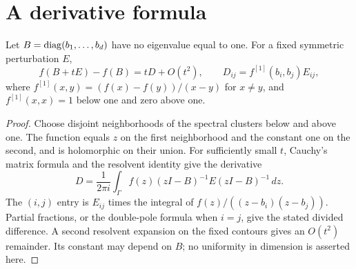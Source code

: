 \documentclass[11pt]{article}
\begin{document}
\section{A derivative formula}
\begin{lemma}\label{lem:derivative}
Let $B=\operatorname{diag}(b_1,\ldots,b_d)$ have no eigenvalue equal to one. For a fixed symmetric perturbation $E$,
\[
 f(B+tE)-f(B)=tD+O(t^2),\qquad
 D_{ij}=f^{[1]}(b_i,b_j)E_{ij},
\]
where $f^{[1]}(x,y)=(f(x)-f(y))/(x-y)$ for $x\ne y$, and $f^{[1]}(x,x)=1$ below one and zero above one.
\end{lemma}
\begin{proof}
Choose disjoint neighborhoods of the spectral clusters below and above one. The function equals $z$ on the first neighborhood and the constant one on the second, and is holomorphic on their union. For sufficiently small $t$, Cauchy's matrix formula and the resolvent identity give the derivative
\[
 D=\frac1{2\pi i}\int_\Gamma
      f(z)(zI-B)^{-1}E(zI-B)^{-1}\,dz.
\]
The $(i,j)$ entry is $E_{ij}$ times the integral of
$f(z)/((z-b_i)(z-b_j))$. Partial fractions, or the double-pole formula when $i=j$, give the stated divided difference. A second resolvent expansion on the fixed contours gives an $O(t^2)$ remainder. Its constant may depend on $B$; no uniformity in dimension is asserted here.
\end{proof}
\end{document}

